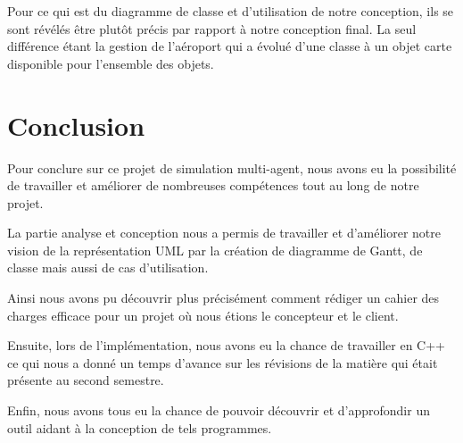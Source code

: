 \documentclass[12pt,french]{article} %
\begin{document}
 \bigskip
 
 Pour ce qui est du diagramme de classe et d'utilisation de notre conception, ils se sont révélés être plutôt précis par rapport à notre conception final. La seul différence étant la gestion de l'aéroport qui a évolué d'une classe à un objet carte disponible pour l'ensemble des objets.

\section{Conclusion}

Pour conclure sur ce projet de simulation multi-agent, nous avons eu la possibilité de travailler et améliorer de nombreuses compétences tout au long de notre projet. 

La partie analyse et conception nous a permis de travailler et d'améliorer notre vision de la représentation UML par la création de diagramme de Gantt, de classe mais aussi de cas d'utilisation.

 Ainsi nous avons pu découvrir plus précisément comment rédiger un cahier des charges efficace pour un projet où nous étions le concepteur et le client. 
 
 Ensuite, lors de l'implémentation, nous avons eu la chance de travailler en C++ ce qui nous a donné un temps d'avance sur les révisions de la matière qui était présente au second semestre. 
 
 Enfin, nous avons tous eu la chance de pouvoir découvrir et d'approfondir un outil aidant à la conception de tels programmes.   

\listoffigures
\end{document}

